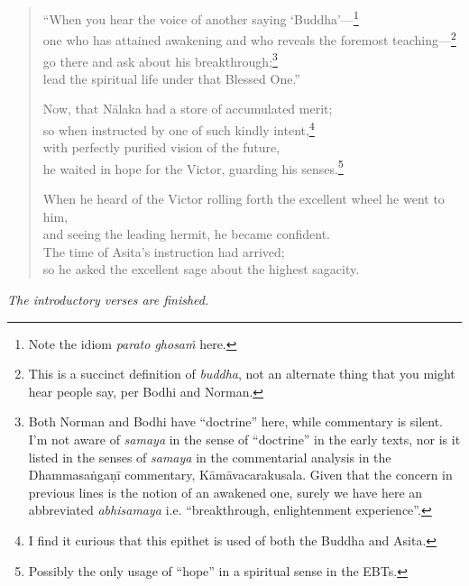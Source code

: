 \documentclass[12pt,openany]{book}%
\newcommand*{\scendsection}[1]{\begin{center}\textit{#1}\end{center}}
\begin{document}
\begin{verse}
“When you hear the voice of another saying ‘Buddha’—\footnote{Note the idiom \textit{parato \textsanskrit{ghosaṁ}} here. } \\
one who has attained awakening and who reveals the foremost teaching—\footnote{This is a succinct definition of \textit{buddha}, not an alternate thing that you might hear people say, per Bodhi and Norman. } \\
go there and ask about his breakthrough;\footnote{Both Norman and Bodhi have “doctrine” here, while commentary is silent. I’m not aware of \textit{samaya} in the sense of “doctrine” in the early texts, nor is it listed in the senses of \textit{samaya} in the commentarial analysis in the \textsanskrit{Dhammasaṅgaṇī} commentary, \textsanskrit{Kāmāvacarakusala}. Given that the concern in previous lines is the notion of an awakened one, surely we have here an abbreviated \textit{abhisamaya} i.e. “breakthrough, enlightenment experience”. } \\
lead the spiritual life under that Blessed One.” 

Now, that \textsanskrit{Nālaka} had a store of accumulated merit; \\
so when instructed by one of such kindly intent,\footnote{I find it curious that this epithet is used of both the Buddha and Asita. } \\
with perfectly purified vision of the future, \\
he waited in hope for the Victor, guarding his senses.\footnote{Possibly the only usage of “hope” in a spiritual sense in the EBTs. } 

When he heard of the Victor rolling forth the excellent wheel he went to him, \\
and seeing the leading hermit, he became confident. \\
The time of Asita’s instruction had arrived; \\
so he asked the excellent sage about the highest sagacity. 

%
\end{verse}

\scendsection{The introductory verses are finished. }
\end{document}
